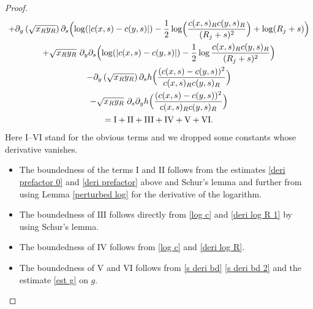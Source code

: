 \documentclass[10pt]{amsart}
\newcommand{\rI}{\mathrm{I}}
\newcommand{\rII}{\mathrm{II}}
\newcommand{\rIII}{\mathrm{III}}
\newcommand{\rIV}{\mathrm{IV}}
\newcommand{\rV}{\mathrm{V}}
\newcommand{\rVI}{\mathrm{VI}}
\theoremstyle{definition}
\let\de\partial
\begin{document}
\begin{proof}
\begin{multline*}
+\de_y\left(\sqrt{x_Ry_R}\right)\de_s \Bigl(\log(|c(x,s)-c(y,s)|)-\frac{1}{2}\log \Bigl(\frac{c(x,s)_Rc(y,s)_R}{(R_j+s)^2} \Bigr)+\log( R_j+s) \Bigr)\\
+\sqrt{x_Ry_R}\,\,\de_y\de_s \Bigl(\log(|c(x,s)-c(y,s)|)-\frac{1}{2}\log\frac{c(x,s)_Rc(y,s)_R}{(R_j+s)^2} \Bigr)\\
-\de_y\left(\sqrt{x_Ry_R}\right)\de_sh \Bigl(\frac{(c(x,s)-c(y,s))^2}{c(x,s)_Rc(y,s)_R} \Bigr)\\
-\sqrt{x_Ry_R}\,\,\de_s\de_yh \Bigl(\frac{(c(x,s)-c(y,s))^2}{c(x,s)_Rc(y,s)_R} \Bigr)\\
=\rI+\rII+\rIII+\rIV+\rV+\rVI.
\end{multline*}
Here $\rI$--$\rVI$ stand for the obvious terms and we dropped some constants whose derivative vanishes.

\begin{itemize}
\item
The boundedness of the terms $\rI$ and $\rII$ follows from the estimates \eqref{deri prefactor 0} and \eqref{deri prefactor} above and Schur's lemma and further from using Lemma \ref{perturbed log} for the derivative of the logarithm.

\item
The boundedness of $\rIII$ follows directly from \eqref{log c} and \eqref{deri log R 1} by using Schur's lemma.

\item
The boundedness of $\rIV$ follows from \eqref{log c} and \eqref{deri log R}.

\item
The boundedness of $\rV$ and $\rVI$ follows from \eqref{s deri bd} \resp \eqref{s deri bd 2} and the estimate \eqref{est g} on $g$.\qedhere
\end{itemize}
\end{proof}
\end{document}
